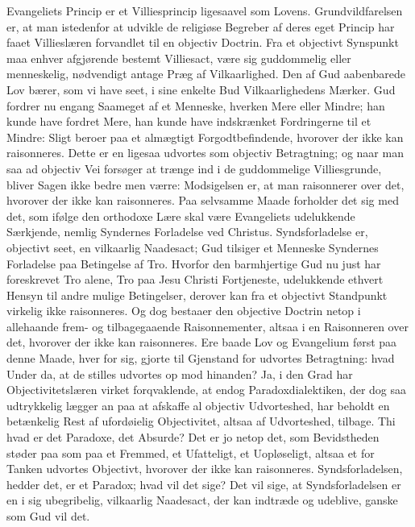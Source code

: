 \documentclass[12pt]{book}
\begin{document}
Evangeliets Princip er et Villiesprincip ligesaavel som Lovens.
Grundvildfarelsen er, at man istedenfor at udvikle de religiøse
Begreber af deres eget Princip har faaet Villieslæren forvandlet til
en objectiv Doctrin. Fra et objectivt Synspunkt maa enhver
afgjørende bestemt Villiesact, være sig guddommelig eller
menneskelig, nødvendigt antage Præg af Vilkaarlighed. Den af Gud
aabenbarede Lov bærer, som vi have seet, i sine enkelte Bud
Vilkaarlighedens Mærker. Gud fordrer nu engang Saa\-meget af et
Menneske, hverken Mere eller Mindre; han kunde have fordret Mere,
han kunde have indskrænket Fordringerne til et Mindre: Sligt beroer
paa et almægtigt Forgodtbefindende, hvorover der ikke kan
raisonneres. Dette er en ligesaa udvortes som objectiv Betragtning;
og naar man saa ad objectiv Vei forsøger at trænge ind i de
guddommelige Villiesgrunde, bliver Sagen ikke bedre
men værre: Modsigelsen er, at man raisonnerer over det, hvorover der
ikke kan raisonneres. Paa selvsamme Maade forholder det sig med det,
som ifølge den orthodoxe Lære skal være Evangeliets udelukkende
Særkjende, nemlig Syndernes Forladelse ved Christus. Syndsforladelse
er, objectivt seet, en vilkaarlig Naadesact; Gud tilsiger et
Menneske Syndernes Forladelse paa Betingelse af Tro. Hvorfor den
barmhjertige Gud nu just har foreskrevet Tro alene, Tro paa Jesu
Christi Fortjeneste, udelukkende ethvert Hensyn til andre mulige
Betingelser, derover kan fra et objectivt Standpunkt virkelig ikke
raisonneres. Og dog bestaaer den objective Doctrin netop i
allehaande frem- og tilbagegaaende Raisonnementer, altsaa i en
Raisonneren over det, hvorover der ikke kan raisonneres. Ere baade
Lov og Evangelium først paa denne Maade, hver for sig, gjorte til
Gjenstand for udvortes Betragtning: hvad Under da, at de stilles
udvortes op mod hinanden? Ja, i den Grad har Objectivitetslæren
virket forqvaklende, at endog Paradoxdialektiken, der dog saa
udtrykkelig lægger an paa at afskaffe al objectiv Udvorteshed, har
beholdt en betænkelig Rest af ufordøielig Objectivitet, altsaa af
Udvorteshed, tilbage. Thi hvad er det Paradoxe, det Absurde? Det er
jo netop det, som Bevidstheden støder paa som paa et Fremmed, et
Ufatteligt, et Uopløseligt, altsaa et for Tanken udvortes Objectivt,
hvorover der ikke kan raisonneres. Syndsforladelsen, hedder det, er
et Paradox; hvad vil det sige? Det vil sige, at Syndsforladelsen er
en i sig ubegribelig, vilkaarlig Naadesact, der kan indtræde og
udeblive, ganske som Gud vil det.
\end{document}
